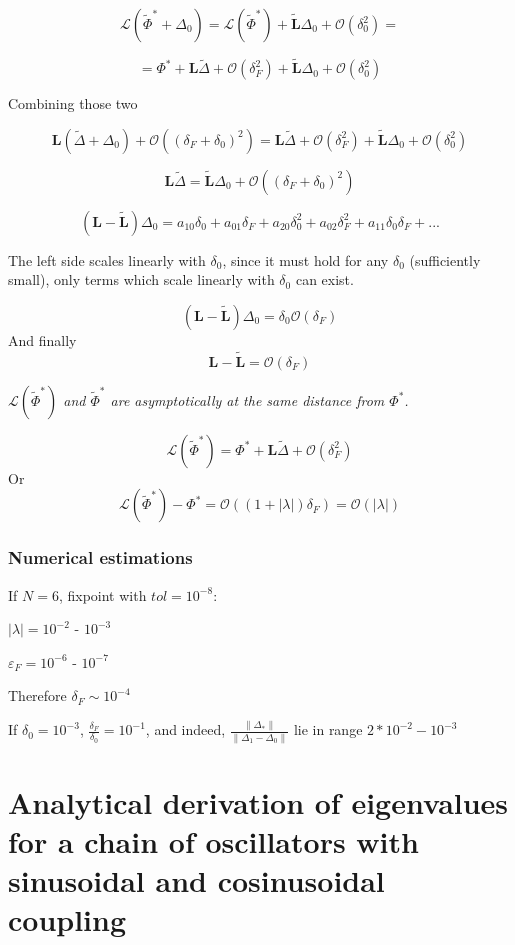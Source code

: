 \documentclass[a4paper,12pt]{article}
\newcommand*{\wt}{\widetilde} %
\newcommand*{\bigO}{\mathcal{O}}
\newcommand*{\FP}{\Phi^*}%
\newcommand*{\D}{\Delta}%
\newcommand*{\Lmap}{\mathcal{L}} %
\newcommand*{\Lmat}{\mathbf{L}}  %
\begin{document}
\begin{appendices}
$$
\mathcal{L}(\wt \FP + \D_0)
= \mathcal{L}(\wt \FP) +  \wt{\mathbf{L}} \D_0 + \mathcal{O}(\delta_0^2) =
$$

$$
=  \FP + \Lmat \wt \D + \mathcal{O}(\delta_F^2)  +  \wt{\mathbf{L}} \D_0 + \mathcal{O}(\delta_0^2)
$$%


Combining those two

$$
\mathbf{L}  ( \wt \D +  \D_0 ) + \mathcal{O}(( \delta_F + \delta_0)^2)
=
\Lmat \wt \D + \mathcal{O}(\delta_F^2)  +  \wt{\mathbf{L}} \D_0 + \mathcal{O}(\delta_0^2)
$$


$$
\mathbf{L} \wt \D 
=
 \wt{\mathbf{L}} \D_0 + \mathcal{O}(( \delta_F + \delta_0)^2)
$$

$$
(\mathbf{L} -  \wt{\mathbf{L}}) \D_0 
=
a_{10} \delta_0 + a_{01} \delta_F + a_{20}  \delta_0^2 + a_{02} \delta_F^2 + a_{11} \delta_0 \delta_F + ...
$$

The left side scales linearly with $\delta_0$, since it must hold for any $\delta_0$ (sufficiently small), only terms which scale linearly with $\delta_0$ can exist.

$$
(\mathbf{L} -  \wt{\mathbf{L}}) \D_0 
=
\delta_0 \bigO(\delta_F)
$$
And finally
$$
\mathbf{L} -  \wt{\mathbf{L}}
=
 \mathcal{O}(\delta_F)
$$

\textit{$\Lmap(\wt \FP)$ and $\wt \FP$ are asymptotically at the same distance from $\FP$.}

\begin{equation}
\Lmap(\wt \FP) = \FP + \Lmat \wt \D + \mathcal{O}(\delta_F ^2)
\end{equation}
Or
\begin{equation}
\Lmap(\wt \FP) - \FP = \bigO((1 + |\lambda|) \delta_F) = \bigO(|\lambda|)
\end{equation}
\subsubsection{Numerical estimations}

If $N = 6$, fixpoint with $ tol  =10 ^{-8}$:

$|\lambda| = 10 ^ {-2}$ - $10 ^ {-3}$

$\varepsilon_F = 10 ^ {-6}$ - $10^{-7}$

Therefore $\delta_F \sim 10 ^{ -4}$

If $\delta_0 = 10 ^{-3}$, $\frac{ \delta_F } {  \delta_0 } = 10^{-1}$, and indeed,
$ \frac{ \lVert \D_* \rVert }  {\lVert \D_1 - \D_0 \rVert }$ lie in range $2 * 10^{-2} - 10 ^{-3} $



\section{Analytical derivation of eigenvalues for a chain of oscillators with sinusoidal and cosinusoidal coupling} 
 

\end{appendices}


\clearpage


\end{document}
